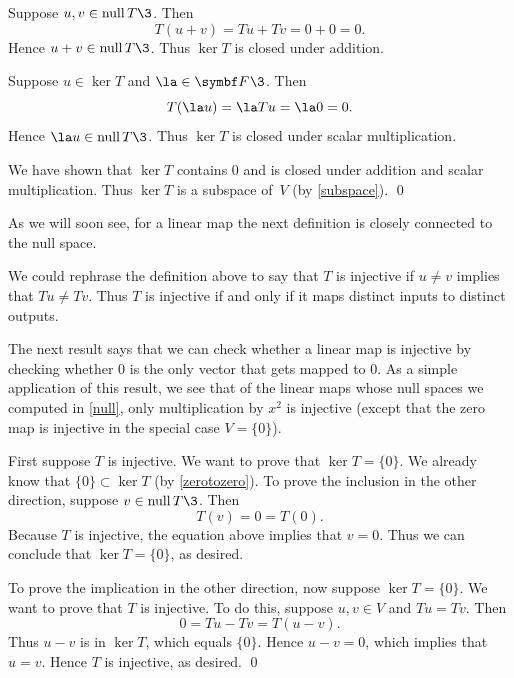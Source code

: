 Suppose $u, v \in \ker T\3$. Then
\[
T(u + v) = Tu + Tv = 0 + 0 = 0.
\]
Hence $u + v \in \ker T\3$.  Thus $\ker T$ is closed under addition.

Suppose $u \in \ker T$ and $\la \in \F{}\3$. Then
\[
T(\la u) = \la Tu = \la 0 = 0.
\]
Hence $\la u \in \ker T\3$.  Thus $\ker T$ is closed under scalar
multiplication.

We have shown that $\ker T$ contains $0$ and is closed under
addition and scalar multiplication.  Thus $\ker T$ is a subspace of~$V$ (by \ref{subspace}).
\qed

As we will soon see, for a linear map the next definition is closely connected to the null space.



We could rephrase the definition above to say that $T$ is injective if $u \ne v$ implies that $Tu \ne Tv$. Thus $T$ is injective if and only if it maps distinct inputs to distinct outputs.

The next result says that we can check whether a linear map is
injective by checking whether $0$ is the only vector
that gets mapped to $0$. As a simple  application of this result, we see
that of the linear maps whose null spaces we computed in \ref{null}, only
multiplication by $x^2$ is injective (except that the zero map is injective in the special case $V = \{0\}$).


\proof
First suppose $T$ is injective.  We want to prove that $\ker T = \{0\}$.  We
already know that $\{0\} \subset \ker T$ (by \ref{zerotozero}).  To prove the inclusion in
the other direction, suppose $v \in \ker T\3$. Then
\[
T(v) = 0 = T(0).
\]
Because $T$ is injective, the equation above implies that $v = 0$.  Thus we can conclude that
\mbox{$\ker T = \{0\}$}, as desired.

To prove the implication in the other direction, now suppose $\ker T = \{0\}$.
We want to prove that $T$ is injective.  To
do this, suppose $u, v \in V$ and $Tu = Tv$.  Then
\[
0 = Tu - Tv = T(u - v).
\]
Thus $u - v$ is in $\ker T$, which equals $\{0\}$.  Hence $u - v = 0$, which
implies that $u = v$.  Hence $T$ is injective, as  desired.
\qed

